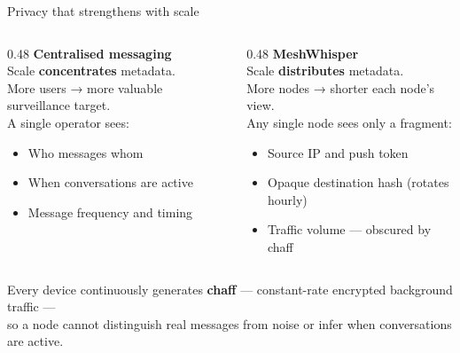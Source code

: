 \documentclass[aspectratio=169, 11pt]{beamer}
\begin{document}
\begin{frame}{Privacy that strengthens with scale}
\vspace{2mm}
\begin{columns}[T]
  \begin{column}{0.48\textwidth}
    {\color{mwred}\textbf{Centralised messaging}}\\[4pt]
    \small Scale \textbf{concentrates} metadata.\\
    More users → more valuable surveillance target.\\[8pt]
    A single operator sees:\\
    \begin{itemize}\small
      \item Who messages whom
      \item When conversations are active
      \item Message frequency and timing
    \end{itemize}
  \end{column}
  \begin{column}{0.48\textwidth}
    {\color{mwgreen}\textbf{MeshWhisper}}\\[4pt]
    \small Scale \textbf{distributes} metadata.\\
    More nodes → shorter each node's view.\\[8pt]
    Any single node sees only a fragment:\\
    \begin{itemize}\small
      \item Source IP and push token
      \item Opaque destination hash (rotates hourly)
      \item Traffic volume — obscured by chaff
    \end{itemize}
  \end{column}
\end{columns}
\vspace{6mm}
\centering
\begin{mdframed}[backgroundcolor=mwlight, linecolor=mwaccent, linewidth=0.6pt,
  innerleftmargin=8pt, innerrightmargin=8pt, innertopmargin=4pt, innerbottommargin=4pt,
  roundcorner=3pt]
\small\color{mwblue}
Every device continuously generates \textbf{chaff} — constant-rate encrypted background traffic —\\
so a node cannot distinguish real messages from noise or infer when conversations are active.
\end{mdframed}
\end{frame}
\end{document}
